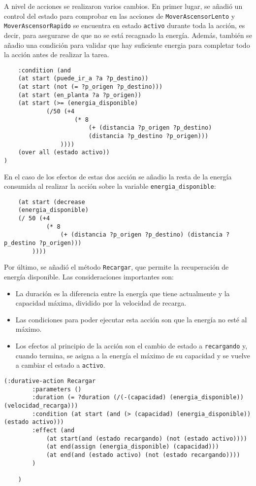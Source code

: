 \documentclass{article}
\begin{document}
A nivel de acciones se realizaron varios cambios. En primer lugar, se añadió un control del estado para comprobar en las acciones de \texttt{MoverAscensorLento} 
y \texttt{MoverAscensorRapido} se encuentra en estado \texttt{activo} durante toda la acción, es decir, para asegurarse de que no se está recagnado la energía. Además, también 
se añadio una condición para validar que hay suficiente energia para completar todo la acción antes de realizar la tarea.
\begin{verbatim}
    :condition (and
    (at start (puede_ir_a ?a ?p_destino))
    (at start (not (= ?p_origen ?p_destino)))
    (at start (en_planta ?a ?p_origen))
    (at start (>= (energia_disponible)
            (/50 (+4
                    (* 8
                        (+ (distancia ?p_origen ?p_destino) 
                        (distancia ?p_destino ?p_origen)))
                ))))
    (over all (estado activo))
)
\end{verbatim}

En el caso de los efectos de estas dos acción se añadio la resta de la energía consumida al realizar la acción sobre la variable \texttt{energia\_disponible}:
\begin{verbatim}
    (at start (decrease
    (energia_disponible)
    (/ 50 (+4
            (* 8
                (+ (distancia ?p_origen ?p_destino) (distancia ?p_destino ?p_origen)))
        ))))
\end{verbatim}

Por último, se añadió el método \texttt{Recargar}, que permite la recuperación de energía disponible. Las consideraciones importantes son:
\begin{itemize}
    \item La duración es la diferencia entre la energía que tiene actualmente y la capacidad máxima, dividido por la velocidad de recarga.
    \item Las condiciones para poder ejecutar esta acción son que la energía no esté al máximo.
    \item Los efectos al principio de la acción son el cambio de estado a \texttt{recargando} y, cuando termina, 
    se asigna a la energía el máximo de su capacidad y se vuelve a cambiar el estado a \texttt{activo}.
\end{itemize}

\begin{verbatim}
(:durative-action Recargar
        :parameters ()
        :duration (= ?duration (/(-(capacidad) (energia_disponible))(velocidad_recarga)))
        :condition (at start (and (> (capacidad) (energia_disponible)) (estado activo)))
        :effect (and
            (at start(and (estado recargando) (not (estado activo))))
            (at end(assign (energia_disponible) (capacidad)))
            (at end(and (estado activo) (not (estado recargando))))
        )

    )
\end{verbatim}
\end{document}
